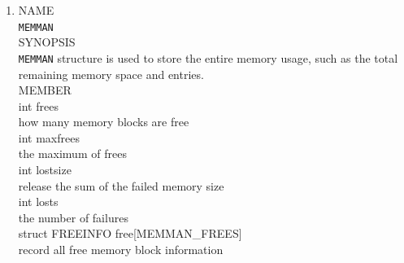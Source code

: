 \documentclass{swfcthesis}
\begin{document}
\begin{enumerate}
  \item
  NAME \\
  \hspace*{1cm}\texttt{MEMMAN} \\
  SYNOPSIS \\
  \hspace*{1cm} \texttt{MEMMAN} structure is used to store the entire
memory usage, such as the total remaining memory space and entries.\\
  MEMBER \\
  \hspace*{1cm} int frees\\
  \hspace*{1.5cm}  how many memory blocks are free\\
  \hspace*{1cm} int maxfrees\\
  \hspace*{1.5cm} the maximum of frees\\
  \hspace*{1cm} int lostsize\\
  \hspace*{1.5cm} release the sum of the failed memory size\\
  \hspace*{1cm} int losts\\
  \hspace*{1.5cm}  the number of failures\\
  \hspace*{1cm} struct FREEINFO free[MEMMAN\_FREES]\\
  \hspace*{1.5cm} record all free memory block information\\


\end{enumerate}
\end{document}
